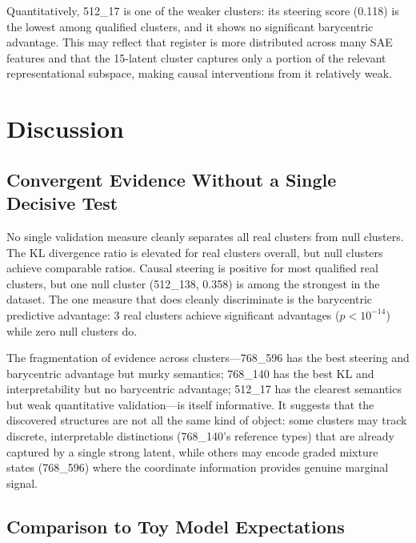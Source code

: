 \documentclass{article}
\begin{document}
Quantitatively, 512\_17 is one of the weaker clusters: its steering score (0.118) is
the lowest among qualified clusters, and it shows no significant barycentric advantage.
This may reflect that register is more distributed across many SAE features and that
the 15-latent cluster captures only a portion of the relevant representational
subspace, making causal interventions from it relatively weak.

\section{Discussion}
\label{sec:discussion}

\subsection{Convergent Evidence Without a Single Decisive Test}
\label{sec:convergent}

No single validation measure cleanly separates all real clusters from null clusters.
The KL divergence ratio is elevated for real clusters overall, but null clusters
achieve comparable ratios.  Causal steering is positive for most qualified real
clusters, but one null cluster (512\_138, 0.358) is among the strongest in the
dataset.  The one measure that does cleanly discriminate is the barycentric predictive
advantage: 3 real clusters achieve significant advantages ($p < 10^{-14}$) while
zero null clusters do.

The fragmentation of evidence across clusters---768\_596 has the best
steering and barycentric advantage but murky semantics; 768\_140 has the best KL and
interpretability but no barycentric advantage; 512\_17 has the clearest semantics
but weak quantitative validation---is itself informative.  It suggests that the
discovered structures are not all the same kind of object: some clusters may track
discrete, interpretable distinctions (768\_140's reference types) that are already
captured by a single strong latent, while others may encode graded mixture states
(768\_596) where the coordinate information provides genuine marginal signal.

\subsection{Comparison to Toy Model Expectations}
\label{sec:toy_comparison}
\end{document}
